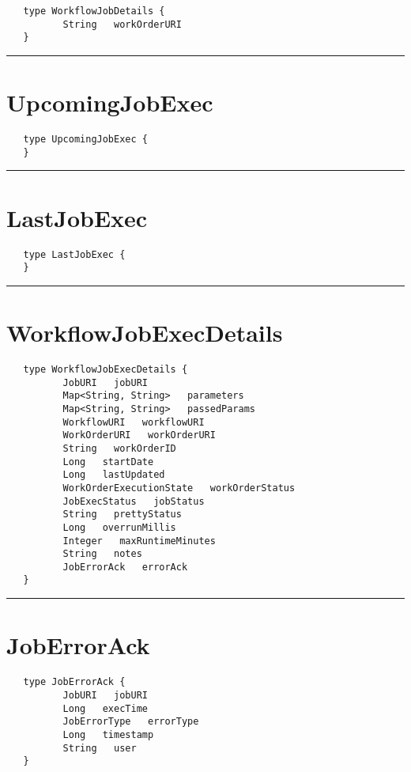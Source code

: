 \begin{verbatim}
   type WorkflowJobDetails {
          String   workOrderURI
   }
\end{verbatim}

\rule{12cm}{2pt}
\section{UpcomingJobExec}
\label{type:UpcomingJobExec}

\begin{verbatim}
   type UpcomingJobExec {
   }
\end{verbatim}

\rule{12cm}{2pt}
\section{LastJobExec}
\label{type:LastJobExec}

\begin{verbatim}
   type LastJobExec {
   }
\end{verbatim}

\rule{12cm}{2pt}
\section{WorkflowJobExecDetails}
\label{type:WorkflowJobExecDetails}

\begin{verbatim}
   type WorkflowJobExecDetails {
          JobURI   jobURI
          Map<String, String>   parameters
          Map<String, String>   passedParams
          WorkflowURI   workflowURI
          WorkOrderURI   workOrderURI
          String   workOrderID
          Long   startDate
          Long   lastUpdated
          WorkOrderExecutionState   workOrderStatus
          JobExecStatus   jobStatus
          String   prettyStatus
          Long   overrunMillis
          Integer   maxRuntimeMinutes
          String   notes
          JobErrorAck   errorAck
   }
\end{verbatim}

\rule{12cm}{2pt}
\section{JobErrorAck}
\label{type:JobErrorAck}

\begin{verbatim}
   type JobErrorAck {
          JobURI   jobURI
          Long   execTime
          JobErrorType   errorType
          Long   timestamp
          String   user
   }
\end{verbatim}

